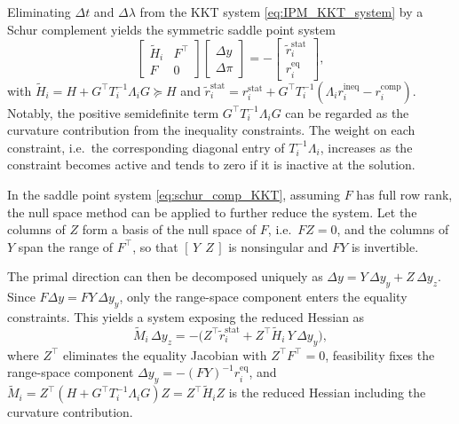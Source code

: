\documentclass[class=scrbook, crop=false]{standalone}
\begin{document}
Eliminating $\Delta t$ and $\Delta\lambda$ from the KKT system \eqref{eq:IPM_KKT_system} by a Schur complement 
yields the symmetric saddle point system
\begin{equation}
    \begin{bmatrix}
        \tilde{H}_i & F^\top \\ F & 0
    \end{bmatrix}
    \begin{bmatrix}
        \Delta y \\ \Delta \pi
    \end{bmatrix}
    = -
    \begin{bmatrix}
        \tilde{r}_i^{\mathrm{stat}} \\ r_i^{\mathrm{eq}}
    \end{bmatrix},
    \label{eq:schur_comp_KKT}
\end{equation}
with
$\tilde{H}_i = H + G^\top T_i^{-1}\Lambda_i G \succeq H$ and
$\tilde{r}_i^{\mathrm{stat}} = r_i^{\mathrm{stat}} + G^\top T_i^{-1}(\Lambda_i r_i^{\mathrm{ineq}} - r_i^{\mathrm{comp}})$.
Notably,
the positive semidefinite term $G^\top T_i^{-1}\Lambda_i G$ can be regarded 
as the curvature contribution from the inequality constraints.
The weight on each constraint, i.e.\ the corresponding diagonal entry of $T_i^{-1}\Lambda_i$,
increases as the constraint becomes active and tends to zero if it is inactive at the solution.

In the saddle point system \eqref{eq:schur_comp_KKT},
assuming $F$ has full row rank,
the null space method can be applied to further reduce the system.
Let the columns of $Z$ form a basis of the null space of $F$, i.e.\ $FZ = 0$,
and the columns of $Y$ span the range of $F^\top$, 
so that $[\,Y \;\, Z\,]$ is nonsingular and $FY$ is invertible.

The primal direction can then be decomposed uniquely as $\Delta y = Y\,\Delta y_y + Z\,\Delta y_z$.
Since $F\Delta y = FY\,\Delta y_y$, only the range-space component enters the equality constraints.
This yields a system exposing the reduced Hessian as
\begin{equation}
    \tilde{M}_i \,\Delta y_z
    = -\big( Z^\top \tilde{r}_i^{\mathrm{stat}}
             + Z^\top \tilde{H}_i\, Y\,\Delta y_y \big),
    \label{eq:schur_comp_KKT_reduced}
\end{equation}
where $Z^\top$ eliminates the equality Jacobian with $Z^\top F^\top = 0$,
feasibility fixes the range-space component $\Delta y_y = -(FY)^{-1} r_i^{\mathrm{eq}}$,
and $\tilde{M}_i = Z^\top (H+G^\top T_i^{-1}\Lambda_i G) Z = Z^\top \tilde{H}_i Z$ is the reduced Hessian including the curvature contribution.
\end{document}
